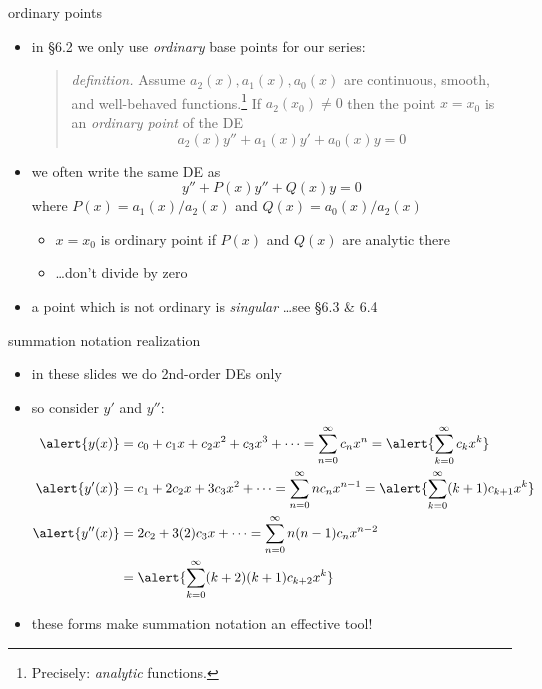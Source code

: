 \documentclass[urlcolor=blue,dvipsnames]{beamer}
\begin{document}
\begin{frame}{ordinary points}

\begin{itemize}
\item in \S6.2 we only use \emph{ordinary} base points for our series:

\medskip
\begin{quote}\normalfont
\emph{definition.}  Assume $a_2(x),a_1(x),a_0(x)$ are continuous, smooth, and well-behaved functions.\footnote{Precisely: \emph{analytic} functions.}  If $a_2(x_0)\ne 0$ then the point $x=x_0$ is an \emph{ordinary point} of the DE
    $$a_2(x) y'' + a_1(x) y' + a_0(x) y = 0$$
\end{quote}

\item we often write the same DE as
    $$y'' + P(x) y'' + Q(x) y = 0$$
where $P(x)=a_1(x)/a_2(x)$ and $Q(x)=a_0(x)/a_2(x)$
    \begin{itemize}
    \item $x=x_0$ is ordinary point if $P(x)$ and $Q(x)$ are analytic there
    \item \dots don't divide by zero
    \end{itemize}
\item a point which is not ordinary is \emph{singular} \dots see \S 6.3 \& 6.4

\bigskip
\end{itemize}
\end{frame}


\begin{frame}{summation notation realization}

\begin{itemize}
\item in these slides we do 2nd-order DEs only
\item so consider $y'$ and $y''$:
\small
\begin{align*}
\alert{y(x)} &= c_0 + c_1 x + c_2 x^2 + c_3 x^3 + \dots = \sum_{n=0}^\infty c_n x^n = \alert{\sum_{k=0}^\infty c_k x^k} \\
\alert{y'(x)} &= c_1 + 2 c_2 x + 3 c_3 x^2 + \dots = \sum_{n=0}^\infty n c_n x^{n-1} = \alert{\sum_{k=0}^\infty (k+1) c_{k+1} x^k} \\
\alert{y''(x)} &= 2 c_2 + 3 (2) c_3 x + \dots = \sum_{n=0}^\infty n (n-1) c_n x^{n-2} \\
       &= \alert{\sum_{k=0}^\infty (k+2)(k+1) c_{k+2} x^k}
\end{align*}
\item \alert{these forms} make summation notation an effective tool!
\end{itemize}
\end{frame}
\end{document}
